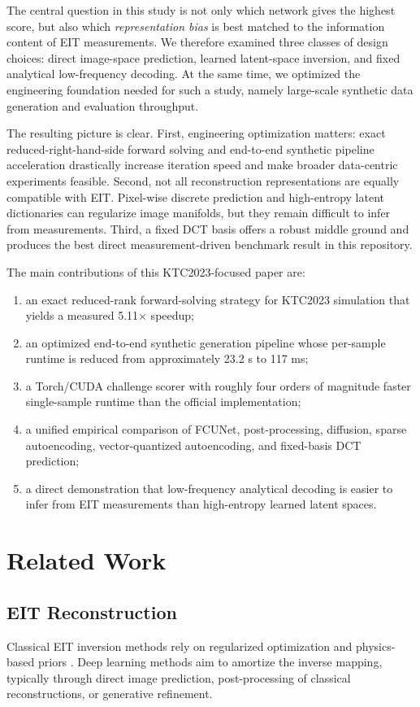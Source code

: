 \documentclass[11pt,a4paper]{article}
\begin{document}
The central question in this study is not only which network gives the highest score, but also which \emph{representation bias} is best matched to the information content of EIT measurements. We therefore examined three classes of design choices: direct image-space prediction, learned latent-space inversion, and fixed analytical low-frequency decoding. At the same time, we optimized the engineering foundation needed for such a study, namely large-scale synthetic data generation and evaluation throughput.

The resulting picture is clear. First, engineering optimization matters: exact reduced-right-hand-side forward solving and end-to-end synthetic pipeline acceleration drastically increase iteration speed and make broader data-centric experiments feasible. Second, not all reconstruction representations are equally compatible with EIT. Pixel-wise discrete prediction and high-entropy latent dictionaries can regularize image manifolds, but they remain difficult to infer from measurements. Third, a fixed DCT basis offers a robust middle ground and produces the best direct measurement-driven benchmark result in this repository.

The main contributions of this KTC2023-focused paper are:
\begin{enumerate}[leftmargin=1.5em]
    \item an exact reduced-rank forward-solving strategy for KTC2023 simulation that yields a measured 5.11$\times$ speedup;
    \item an optimized end-to-end synthetic generation pipeline whose per-sample runtime is reduced from approximately 23.2 s to 117 ms;
    \item a Torch/CUDA challenge scorer with roughly four orders of magnitude faster single-sample runtime than the official implementation;
    \item a unified empirical comparison of FCUNet, post-processing, diffusion, sparse autoencoding, vector-quantized autoencoding, and fixed-basis DCT prediction;
    \item a direct demonstration that low-frequency analytical decoding is easier to infer from EIT measurements than high-entropy learned latent spaces.
\end{enumerate}

\section{Related Work}
\subsection{EIT Reconstruction}
Classical EIT inversion methods rely on regularized optimization and physics-based priors \cite{cheney1999eit,adler2006eidors}. Deep learning methods aim to amortize the inverse mapping, typically through direct image prediction, post-processing of classical reconstructions, or generative refinement.
\end{document}

